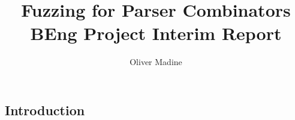 \documentclass{article}
\title{Fuzzing for Parser Combinators \\ {\large BEng Project Interim Report}}
\author{Oliver Madine}
\date{}
\begin{document}
\maketitle

\begin{multicols}{2}
\section{Introduction}


\lipsum\lipsum\lipsum\lipsum

\end{multicols}



\end{document}
